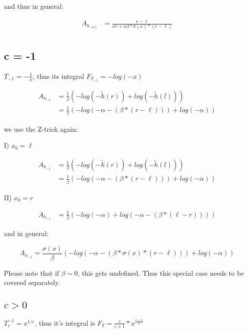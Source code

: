 and thus in general:

\begin{align*}
	A_{h_{-0.5}} & = \frac{r - \ell}{\alpha^2 + \alpha \beta * \sigma(x) * (r - \ell)}\\
\end{align*}







\subsection{c = -1}

$T_{-1} = -\frac{1}{x}$, thus its integral $F_{T_{-1}} = - log(-x)$

\begin{align*}
	A_{h_{-1}} &= \frac{1}{\beta} \left(-log(-\tilde{h}(r)) + log(-\tilde{h}(l)) \right) \\
&= \frac{1}{\beta} \left(-log(-\alpha - (\beta * (r - \ell))) + log(-\alpha) \right)
\end{align*}

we use the Z-trick again:

I) $x_0 = \ell$

\begin{align*}
	A_{h_{-1}} &= \frac{1}{\beta} \left(-log(-\tilde{h}(r)) + log(-\tilde{h}(l)) \right) \\
&= \frac{1}{\beta} \left(-log(-\alpha - (\beta * (r - \ell))) + log(-\alpha) \right)
\end{align*}

II) $x_0 = r$

\begin{align*}
A_{h_{-1}} &= \frac{1}{\beta} \left(- log(-\alpha) + log(-\alpha - (\beta * (\ell - r))) \right)
\end{align*}


and in general:

\[
	A_{h_{-1}} = \frac{\sigma(x)}{\beta} \left(-log(-\alpha - (\beta * \sigma(x) * (r - \ell))) + log(-\alpha) \right)
\]

Please note that if $\beta \sim 0$, this gets undefined. Thus this special case needs to be covered separately.

\subsection{$c > 0$}

$T_c^{-1} = x^{1/c}$, thus it's integral is $F_T = \frac{c}{c + 1} * x^{\frac{c + 1}{c}}$

